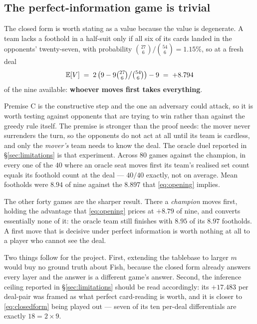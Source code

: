 \documentclass[11pt,a4paper]{article}
\begin{document}
\subsection{The perfect-information game is trivial}

The closed form is worth stating as a value because the value is degenerate. A
team lacks a foothold in a half-suit only if all six of its cards landed in the
opponents' twenty-seven, with probability $\binom{27}{6}/\binom{54}{6} =
1.15\%$, so at a fresh deal
\begin{equation}
\mathbb{E}[V] \;=\; 2\left(9 - 9\tbinom{27}{6}\big/\tbinom{54}{6}\right) - 9
\;=\; +8.794
\label{eq:opening}
\end{equation}
of the nine available: \textbf{whoever moves first takes everything}.

Premise C is the constructive step and the one an adversary could attack, so it
is worth testing against opponents that are trying to win rather than against
the greedy rule itself. The premise is stronger than the proof needs: the mover
never surrenders the turn, so the opponents do not act at all until its team is
cardless, and only the \emph{mover's} team needs to know the deal. The oracle
duel reported in \S\ref{sec:limitations} is that experiment. Across $80$ games against
the champion, in every one of the $40$ where an oracle seat moves first its
team's realised set count equals its foothold count at the deal --- $40/40$
exactly, not on average. Mean footholds were $8.94$ of nine against the $8.897$
that \eqref{eq:opening} implies.

The other forty games are the sharper result. There a \emph{champion} moves
first, holding the advantage that \eqref{eq:opening} prices at $+8.79$ of nine,
and converts essentially none of it: the oracle team still finishes with $8.95$
of its $8.97$ footholds. A first move that is decisive under perfect
information is worth nothing at all to a player who cannot see the deal.

Two things follow for the project. First, extending the tablebase to larger $m$
would buy no ground truth about Fish, because the closed form already answers
every layer and the answer is a different game's answer. Second, the inference
ceiling reported in \S\ref{sec:limitations} should be read accordingly: its
$+17.483$ per deal-pair was framed as what perfect card-reading is worth, and it
is closer
to \eqref{eq:closedform} being played out --- seven of its ten per-deal
differentials are exactly $18 = 2 \times 9$.
\end{document}
